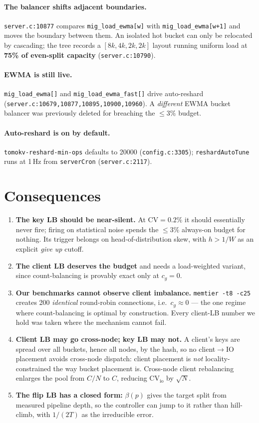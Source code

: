 \documentclass[11pt]{article}
\begin{document}
\paragraph{The balancer shifts adjacent boundaries.}
\texttt{server.c:10877} compares \texttt{mig\_load\_ewma[w]} with \texttt{mig\_load\_ewma[w+1]}
and moves the boundary between them. An isolated hot bucket can only be relocated by
cascading; the tree records a $[8k,4k,2k,2k]$ layout running uniform load at \textbf{75\% of
even-split capacity} (\texttt{server.c:10790}).

\paragraph{EWMA is still live.} \texttt{mig\_load\_ewma[]} and \texttt{mig\_load\_ewma\_fast[]}
drive auto-reshard (\texttt{server.c:10679,10877,10895,10900,10960}). A \emph{different} EWMA
bucket balancer was previously deleted for breaching the $\le3\%$ budget.

\paragraph{Auto-reshard is on by default.} \texttt{tomokv-reshard-min-ops} defaults to 20000
(\texttt{config.c:3305}); \texttt{reshardAutoTune} runs at 1\,Hz from \texttt{serverCron}
(\texttt{server.c:2117}).

\section{Consequences}
\begin{enumerate}
\item \textbf{The key LB should be near-silent.} At $\mathrm{CV}=0.2\%$ it should essentially
never fire; firing on statistical noise spends the $\le3\%$ always-on budget for nothing. Its
trigger belongs on head-of-distribution skew, with $h>1/W$ as an explicit \emph{give up}
cutoff.
\item \textbf{The client LB deserves the budget} and needs a load-weighted variant, since
count-balancing is provably exact only at $c_g=0$.
\item \textbf{Our benchmarks cannot observe client imbalance.} \texttt{memtier -t8 -c25}
creates 200 \emph{identical} round-robin connections, i.e.\ $c_g\approx0$ --- the one regime
where count-balancing is optimal by construction. Every client-LB number we hold was taken
where the mechanism cannot fail.
\item \textbf{Client LB may go cross-node; key LB may not.} A client's keys are spread over all
buckets, hence all nodes, by the hash, so no client$\to$IO placement avoids cross-node
dispatch: client placement is \emph{not} locality-constrained the way bucket placement is.
Cross-node client rebalancing enlarges the pool from $C/N$ to $C$, reducing
$\mathrm{CV}_{\mathrm{io}}$ by $\sqrt{N}$.
\item \textbf{The flip LB has a closed form:} $\beta(p)$ gives the target split from measured
pipeline depth, so the controller can jump to it rather than hill-climb, with $1/(2T)$ as the
irreducible error.
\end{enumerate}
\end{document}
